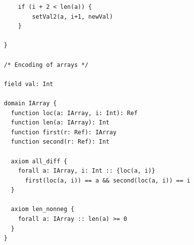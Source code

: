 \documentclass[12pt]{article}
\begin{document}
\begin{lstlisting}
	if (i + 2 < len(a)) {
        setVal2(a, i+1, newVal)
    }

}

/* Encoding of arrays */

field val: Int

domain IArray {
  function loc(a: IArray, i: Int): Ref
  function len(a: IArray): Int
  function first(r: Ref): IArray
  function second(r: Ref): Int

  axiom all_diff {
    forall a: IArray, i: Int :: {loc(a, i)}
      first(loc(a, i)) == a && second(loc(a, i)) == i
  }

  axiom len_nonneg {
    forall a: IArray :: len(a) >= 0
  }
}
\end{lstlisting}



\end{document}
